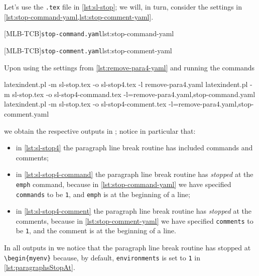 	Let's use the \texttt{.tex} file in \cref{lst:sl-stop}; we will,
	in turn, consider the settings in \cref{lst:stop-command-yaml,lst:stop-comment-yaml}.

	\begin{minipage}{.45\linewidth}
	\end{minipage}
	\hfill
	\begin{minipage}{.49\linewidth}
		[MLB-TCB]{\texttt{stop-command.yaml}}{lst:stop-command-yaml}

		[MLB-TCB]{\texttt{stop-comment.yaml}}{lst:stop-comment-yaml}
	\end{minipage}

	Upon using the settings from \vref{lst:remove-para4-yaml} and running the commands
	\begin{widepage}
		\begin{commandshell}
latexindent.pl -m sl-stop.tex -o sl-stop4.tex -l remove-para4.yaml
latexindent.pl -m sl-stop.tex -o sl-stop4-command.tex -l=remove-para4.yaml,stop-command.yaml
latexindent.pl -m sl-stop.tex -o sl-stop4-comment.tex -l=remove-para4.yaml,stop-comment.yaml
    \end{commandshell}
	\end{widepage}
	we obtain the respective outputs in ; notice in particular
	that:
	\begin{itemize}
		\item in \cref{lst:sl-stop4} the paragraph line break routine has included commands and
		      comments;
		\item in \cref{lst:sl-stop4-command} the paragraph line break routine has
		      \emph{stopped} at the \texttt{emph} command, because in
		      \cref{lst:stop-command-yaml} we have specified \texttt{commands} to be
		      \texttt{1}, and \texttt{emph} is at the beginning of a
		      line;
		\item in \cref{lst:sl-stop4-comment} the paragraph line break routine has
		      \emph{stopped} at the comments, because in \cref{lst:stop-comment-yaml} we
		      have specified \texttt{comments} to be \texttt{1}, and the
		      comment is at the beginning of a line.
	\end{itemize}
	In all outputs in  we notice that the paragraph line break
	routine has stopped at \lstinline!\begin{myenv}! because, by default,
	\texttt{environments} is set to \texttt{1} in
	\vref{lst:paragraphsStopAt}.

